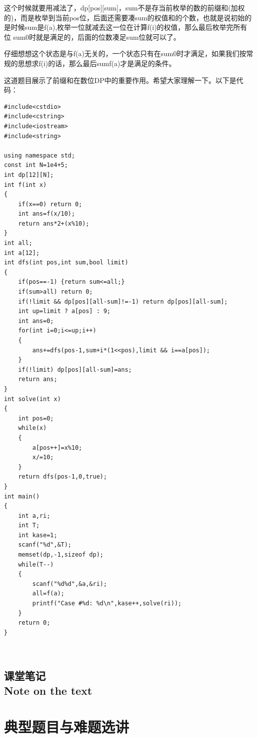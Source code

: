 \documentclass{article}
\theoremstyle{nonumberplain}
\newcommand{\note}{\ \par


	\subsection*{课堂笔记\\\tiny{Note on the text}}
	\newpage}
\begin{document}
这个时候就要用减法了，dp[pos][sum]，sum不是存当前枚举的数的前缀和(加权的)，而是枚举到当前pos位，后面还需要凑sum的权值和的个数，也就是说初始的是时候sum是f(a),枚举一位就减去这一位在计算f(i)的权值，那么最后枚举完所有位 sum\leq 0时就是满足的，后面的位数凑足sum位就可以了。

仔细想想这个状态是与f(a)无关的，一个状态只有在sum\leq 0时才满足，如果我们按常规的思想求f(i)的话，那么最后sum\leq f(a)才是满足的条件。

这道题目展示了前缀和在数位DP中的重要作用。希望大家理解一下。以下是代码：
\begin{verbatim}
#include<cstdio>  
#include<cstring>  
#include<iostream>  
#include<string>  
  
using namespace std;  
const int N=1e4+5;  
int dp[12][N];  
int f(int x)  
{  
    if(x==0) return 0;  
    int ans=f(x/10);  
    return ans*2+(x%10);  
}  
int all;  
int a[12];  
int dfs(int pos,int sum,bool limit)  
{  
    if(pos==-1) {return sum<=all;}  
    if(sum>all) return 0;  
    if(!limit && dp[pos][all-sum]!=-1) return dp[pos][all-sum];  
    int up=limit ? a[pos] : 9;  
    int ans=0;  
    for(int i=0;i<=up;i++)  
    {  
        ans+=dfs(pos-1,sum+i*(1<<pos),limit && i==a[pos]);  
    }  
    if(!limit) dp[pos][all-sum]=ans;  
    return ans;  
}  
int solve(int x)  
{  
    int pos=0;  
    while(x)  
    {  
        a[pos++]=x%10;  
        x/=10;  
    }  
    return dfs(pos-1,0,true);  
}  
int main()  
{  
    int a,ri;  
    int T;  
    int kase=1;  
    scanf("%d",&T);  
    memset(dp,-1,sizeof dp);  
    while(T--)  
    {  
        scanf("%d%d",&a,&ri);  
        all=f(a);  
        printf("Case #%d: %d\n",kase++,solve(ri));  
    }  
    return 0;  
}  
\end{verbatim}
	\note
	\section{典型题目与难题选讲}
\end{document}
